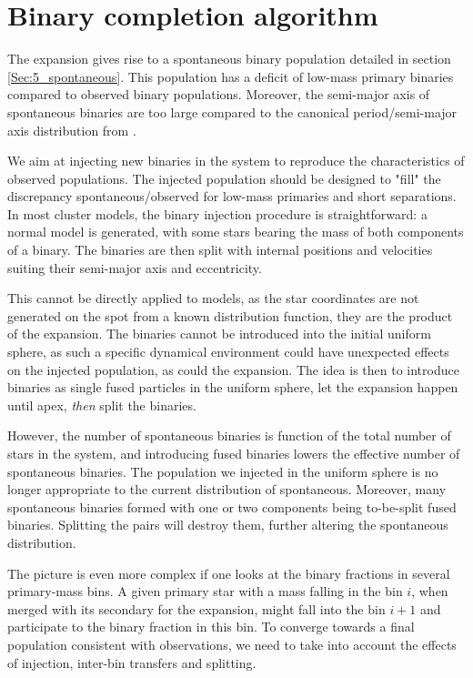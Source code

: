 \chapter{Binary completion algorithm}
\label{App:completion}

The \HubLem expansion gives rise to a spontaneous binary population detailed in section \ref{Sec:5_spontaneous}. This population has a deficit of low-mass primary binaries compared to observed binary populations. Moreover, the semi-major axis of spontaneous binaries are too large compared to the canonical period/semi-major axis distribution from \cite{Raghavan2010}.

We aim at injecting new binaries in the system to reproduce the characteristics of observed populations. The injected population should be designed to "fill" the discrepancy spontaneous/observed for low-mass primaries and short separations. In most cluster models, the binary injection procedure is straightforward: a normal model is generated, with some stars bearing the mass of both components of a binary. The binaries are then split with internal positions and velocities suiting their semi-major axis and eccentricity. 

This cannot be directly applied to \HubLem models, as the star coordinates are not generated on the spot from a known distribution function, they are the product of the expansion. The binaries cannot be introduced into the initial uniform sphere, as such a specific dynamical environment could have unexpected effects on the injected population, as could the expansion. The idea is then to introduce binaries as single fused particles in the uniform sphere, let the expansion happen until apex, \textit{then} split the binaries.

However, the number of spontaneous binaries is function of the total number of stars in the system, and introducing fused binaries lowers the effective number of spontaneous binaries. The population we injected in the uniform sphere is no longer appropriate to the current distribution of spontaneous. Moreover, many spontaneous binaries formed with one or two components being to-be-split fused binaries. Splitting the pairs will destroy them, further altering the spontaneous distribution.

The picture is even more complex if one looks at the binary fractions in several primary-mass bins. A given primary star with a mass falling in the bin $i$, when merged with its secondary for the expansion, might fall into the bin $i+1$ and participate to the binary fraction in this bin. To converge towards a final population consistent with observations, we need to take into account the effects of injection, inter-bin transfers and splitting.

